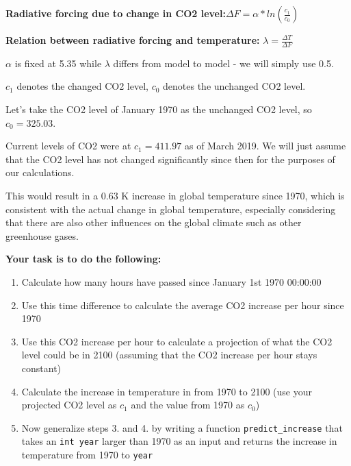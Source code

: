 \vspace{1em}

\noindent \textbf{Radiative forcing due to change in CO2 level:}\qquad \qquad \qquad $\Delta F = \alpha * ln(\frac{c_1}{c_0})$

\vspace{1em}

\noindent \textbf{Relation between radiative forcing and temperature:} \qquad $\lambda = \frac{\Delta T}{\Delta F}$

\vspace{1em}

\noindent $\alpha$ is fixed at 5.35 while $\lambda$ differs from model to model - we will simply use 0.5.

\vspace{1em}

\noindent $c_1$ denotes the changed CO2 level, $c_0$ denotes the unchanged CO2 level.

\vspace{1em}

\noindent Let's take the CO2 level of January 1970 as the unchanged CO2 level, so $c_0 = 325.03$. 

\vspace{1em}

\noindent Current levels of CO2 were at $c_1 = 411.97$ as of March 2019. We will just assume that the CO2 level has not changed significantly since then for the purposes of our calculations.

\vspace{1em}

\noindent This would result in a 0.63 K increase in global temperature since 1970, which is consistent with the actual change in global temperature, especially considering that there are also other influences on the global climate such as other greenhouse gases.

\vspace{1em}

\noindent \textbf{Your task is to do the following:} 

    \begin{enumerate}

        \item Calculate how many hours have passed since January 1st 1970 00:00:00
        \item Use this time difference to calculate the average CO2 increase per hour since 1970
        \item Use this CO2 increase per hour to calculate a projection of what the CO2 level could be in 2100 (assuming that the CO2 increase per hour stays constant)
        \item Calculate the increase in temperature in from 1970 to 2100 (use your projected CO2 level as $c_1$ and the value from 1970 as $c_0$)
        \item Now generalize steps 3. and 4. by writing a function \texttt{predict\_increase} that takes an \texttt{int year} larger than 1970 as an input and returns the increase in temperature from 1970 to \texttt{year}

    \end{enumerate}

